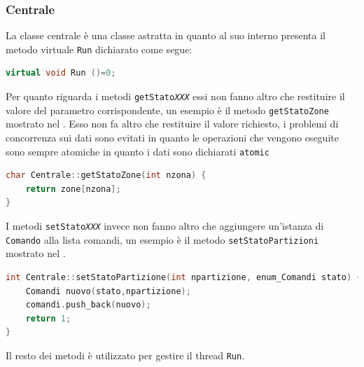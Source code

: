 \subsubsection{Centrale}
La classe centrale è una classe astratta in quanto al suo interno presenta il metodo virtuale \texttt{Run} dichiarato come segue:
\begin{lstlisting}[language=C++,caption=Metodo astratto Run]
virtual void Run ()=0;
\end{lstlisting}
Per quanto riguarda i metodi \texttt{getStato\emph{XXX}} essi non  fanno altro che restituire il valore del parametro corrispondente, un esempio è il metodo \texttt{getStatoZone} mostrato nel . Esso non fa altro che restituire il valore richiesto, i problemi di concorrenza sui dati sono evitati in quanto le operazioni che vengono eseguite sono sempre atomiche in quanto i dati sono dichiarati \texttt{atomic}
\begin{lstlisting}[language=C++,caption=Metodo getStatoZone,label=lst:getzone]
char Centrale::getStatoZone(int nzona) {
    return zone[nzona];
}
\end{lstlisting}
I metodi \texttt{setStato\emph{XXX}} invece non fanno altro che aggiungere un'istanza di \texttt{Comando} alla lista comandi, un esempio è il metodo \texttt{setStatoPartizioni} mostrato nel .
\begin{lstlisting}[language=C++,caption=Metodo setStatoPartizioni,label=lst:setpart]
int Centrale::setStatoPartizione(int npartizione, enum_Comandi stato) {
    Comandi nuovo(stato,npartizione);
    comandi.push_back(nuovo);
    return 1;
}
\end{lstlisting}
Il resto dei metodi è utilizzato per gestire il thread \texttt{Run}.

